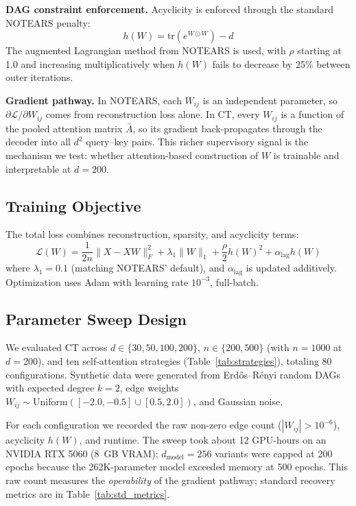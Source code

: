 \documentclass[12pt,a4paper]{article}
\begin{document}
\textbf{DAG constraint enforcement.} Acyclicity is enforced through the standard NOTEARS penalty:
\begin{equation}
    h(W) = \text{tr}(e^{W \odot W}) - d
    \label{eq:h}
\end{equation}
The augmented Lagrangian method from NOTEARS \cite{zheng2018dags} is used, with $\rho$ starting at 1.0 and increasing multiplicatively when $h(W)$ fails to decrease by 25\% between outer iterations.

\textbf{Gradient pathway.} In NOTEARS, each $W_{ij}$ is an independent parameter, so $\partial\mathcal{L}/\partial W_{ij}$ comes from reconstruction loss alone. In CT, every $W_{ij}$ is a function of the pooled attention matrix $\bar{A}$, so its gradient back-propagates through the decoder into all $d^2$ query--key pairs. This richer supervisory signal is the mechanism we test: whether attention-based construction of $W$ is trainable and interpretable at $d=200$.

\subsection{Training Objective}

The total loss combines reconstruction, sparsity, and acyclicity terms:
\begin{equation}
    \mathcal{L}(W) = \frac{1}{2n} \|X - X W\|_F^2 + \lambda_1 \|W\|_1 + \frac{\rho}{2} h(W)^2 + \alpha_{\text{lag}} h(W)
    \label{eq:loss}
\end{equation}
where $\lambda_1 = 0.1$ (matching NOTEARS' default), and $\alpha_{\text{lag}}$ is updated additively. Optimization uses Adam \cite{kingma2014adam} with learning rate $10^{-3}$, full-batch.

\subsection{Parameter Sweep Design}

We evaluated CT across $d \in \{30, 50, 100, 200\}$, $n \in \{200, 500\}$ (with $n=1000$ at $d=200$), and ten self-attention strategies (Table~\ref{tab:strategies}), totaling 80 configurations. Synthetic data were generated from Erd\H{o}s--R\'{e}nyi random DAGs with expected degree $k=2$, edge weights $W_{ij} \sim \text{Uniform}([-2.0, -0.5] \cup [0.5, 2.0])$, and Gaussian noise.

For each configuration we recorded the raw non-zero edge count ($|W_{ij}| > 10^{-6}$), acyclicity $h(W)$, and runtime. The sweep took about 12 GPU-hours on an NVIDIA RTX 5060 (8~GB VRAM); $d_{\text{model}}=256$ variants were capped at 200 epochs because the 262K-parameter model exceeded memory at 500 epochs. This raw count measures the \emph{operability} of the gradient pathway; standard recovery metrics are in Table~\ref{tab:std_metrics}.
\end{document}

